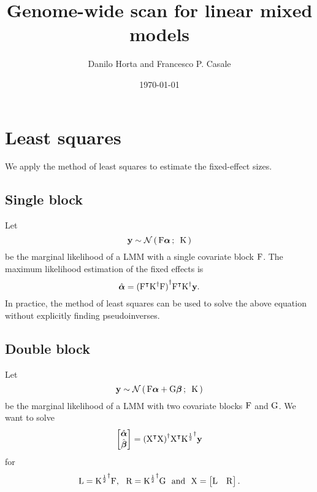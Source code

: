 \documentclass[twocolumn,draft]{article}
\title{Genome-wide scan for linear mixed models}
\author{Danilo Horta and Francesco P. Casale}
\date{\today}
\begin{document}
	\maketitle

\section{Least squares}

We apply the method of least squares to estimate the fixed-effect sizes.

\subsection{Single block}

Let
\begin{equation}\label{eq:lmm}
  \mathbf{y} \sim \mathcal{N}\left(\, {\mathrm{F}\boldsymbol{\alpha}} \,;\,~{\mathrm{K}} \,\right)
\end{equation}
be the marginal likelihood of a LMM with a single covariate block $\mathrm{F}$.
The maximum likelihood estimation of the fixed effects is
\begin{equation*}
	\hat{\boldsymbol{\alpha}} = {({\mathrm{F}}^\intercal{\mathrm{K}}^{\dagger}\mathrm{F})}^{\dagger}
	               {\mathrm{F}}^\intercal{\mathrm{K}}^{\dagger}\mathbf{y}.
\end{equation*}
In practice, the method of least squares can be used to solve the above
equation without explicitly finding pseudoinverses.

\subsection{Double block}

Let
\begin{equation*}
  \mathbf{y} \sim \mathcal{N}\left(\, {\mathrm{F}\boldsymbol{\alpha} + \mathrm{G}\boldsymbol{\beta}} \,;\,~{\mathrm{K}} \,\right)
\end{equation*}
be the marginal likelihood of a LMM with two covariate blocks $\mathrm{F}$ and
$\mathrm{G}$.
We want to solve
\begin{equation*}
	\begin{bmatrix}
		\hat{\boldsymbol{\alpha}} \\
		\hat{\boldsymbol{\beta}}
	\end{bmatrix} = {({\mathrm{X}}^\intercal\mathrm{X})}^{\dagger}{\mathrm{X}}^\intercal{\mathrm{K}^{\frac{1}{2}}}^{\dagger}\mathbf{y}
\end{equation*}
for
\begin{equation*}
\mathrm{L} = {\mathrm{K}^{\frac{1}{2}}}^{\dagger}\mathrm{F},~~ \mathrm{R} = {\mathrm{K}^{\frac{1}{2}}}^{\dagger}\mathrm{G}~~\text{and}~~
	\mathrm{X} =
		\begin{bmatrix}
			\mathrm{L} & \mathrm{R}
		\end{bmatrix}.
\end{equation*}
\end{document}
